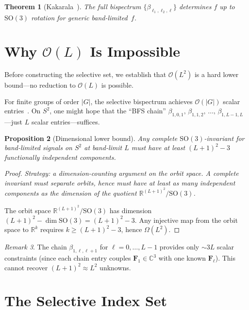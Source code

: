 \documentclass{article}
\theoremstyle{plain}
\newtheorem{theorem}{Theorem}[section]
\newtheorem{proposition}[theorem]{Proposition}
\theoremstyle{definition}
\theoremstyle{remark}
\newtheorem{remark}[theorem]{Remark}
\newcommand{\SO}{\mathrm{SO}}
\newcommand{\R}{\mathbb{R}}
\newcommand{\C}{\mathbb{C}}
\begin{document}
\begin{theorem}[Kakarala~\cite{kakarala2009}]\label{thm:full-complete}
The full bispectrum $\{\beta_{\ell_1,\ell_2,\ell}\}$ determines $f$
up to $\SO(3)$ rotation for generic band-limited~$f$.
\end{theorem}


\section{Why $\mathcal{O}(L)$ Is Impossible}\label{sec:lower-bound}

Before constructing the selective set, we establish that
$\mathcal{O}(L^2)$ is a hard lower bound---no reduction to
$\mathcal{O}(L)$ is possible.

For finite groups of order $|G|$, the selective bispectrum achieves
$\mathcal{O}(|G|)$ scalar entries~\cite{mataigne2024}. On $S^2$, one
might hope that the ``BFS chain'' $\beta_{1,0,1},\,
\beta_{1,1,2},\,\dotsc,\,\beta_{1,L-1,L}$---just $L$ scalar
entries---suffices.

\begin{proposition}[Dimensional lower bound]\label{prop:lower-bound}
Any complete $\SO(3)$-invariant for band-limited signals on $S^2$
at band-limit $L$ must have at least $(L+1)^2 - 3$ functionally
independent components.
\end{proposition}
\begin{proof}
\emph{Strategy: a dimension-counting argument on the orbit space.
A complete invariant must separate orbits, hence must have at least
as many independent components as the dimension of the quotient
$\R^{(L+1)^2}/\SO(3)$.}

The orbit space $\R^{(L+1)^2} / \SO(3)$ has dimension
$(L+1)^2 - \dim\SO(3) = (L+1)^2 - 3$. Any injective map from the
orbit space to $\R^k$ requires $k \ge (L+1)^2 - 3$, hence
$\Omega(L^2)$.
\end{proof}

\begin{remark}
The chain $\beta_{1,\ell,\ell+1}$ for $\ell = 0, \dotsc, L-1$ provides
only $\sim 3L$ scalar constraints (since each chain entry couples
$\mathbf{F}_1 \in \C^3$ with one known $\mathbf{F}_\ell$). This cannot
recover $(L+1)^2 \approx L^2$ unknowns.
\end{remark}


\section{The Selective Index Set}\label{sec:index-set}
\end{document}
